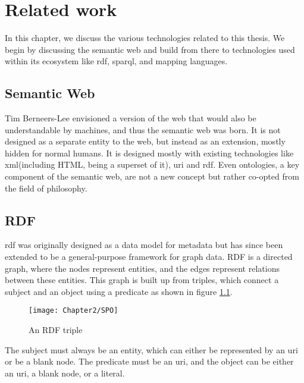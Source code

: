 
\chapter{Related work}
\label{chapter:related_work}

In this chapter, we discuss the various technologies related to this thesis. We begin by discussing the semantic web and build from there to technologies used within its ecosystem like \acrshort{rdf}, \acrshort{sparql}, and mapping languages. 

\section{Semantic Web}
Tim Berneers-Lee envisioned a version of the web that would also be understandable by machines, and thus the semantic web was born. It is not designed as a separate entity to the web, but instead as an extension, mostly hidden for normal humans. It is designed mostly with existing technologies like \acrshort{xml}(including HTML, being a superset of it), \acrshort{uri} and \acrshort{rdf}. Even ontologies, a key component of the semantic web, are not a new concept but rather co-opted from the field of philosophy. \citep{thesemanticweb}

\section{RDF}
\acrshort{rdf} was originally designed as a data model for metadata but has since been extended to be a general-purpose framework for graph data. RDF is a directed graph, where the nodes represent entities, and the edges represent relations between these entities. This graph is built up from triples, which connect a subject and an object using a predicate as shown in figure \ref{fig:rdf_triple}. 

\begin{figure}
    \centering
    \texttt{[image: Chapter2/SPO]}
    \caption{An RDF triple}
    \label{fig:rdf_triple}
\end{figure}

The subject must always be an entity, which can either be represented by an \acrshort{uri} or be a blank node. The predicate must be an \acrshort{uri}, and the object can be either an \acrshort{uri}, a blank node, or a literal. \citep{rdfprimer}

